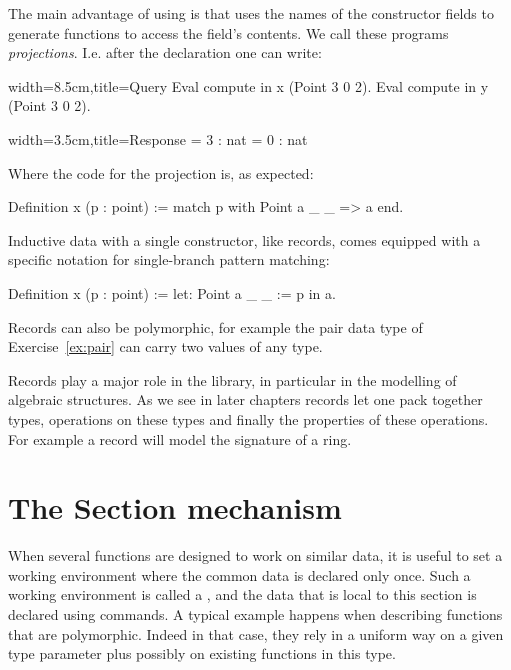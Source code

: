 The main advantage of using  is that \Coq{} uses the names of the
constructor fields to generate functions to access the field's contents.  We
call these programs \emph{projections}.  I.e. after the  declaration
one can write:

\begin{coq}{}{width=8.5cm,title=Query}
Eval compute in x (Point 3 0 2).
Eval compute in y (Point 3 0 2).
\end{coq}{}{}
\begin{coqout}{}{width=3.5cm,title=Response}
= 3 : nat
= 0 : nat
\end{coqout}{}{}
Where the code for the  projection is, as expected:

\begin{coq}{}{}
Definition x (p : point) := match p with Point a _ _ => a end.
\end{coq}
Inductive data with a single constructor, like records, comes
equipped with a specific notation for single-branch pattern
matching:

\begin{coq}{}{}
Definition x (p : point) := let: Point a _ _ := p in a.
\end{coq}

Records can also be polymorphic, for example the pair data type of
Exercise~\ref{ex:pair} can carry two values of any type.

Records play a major role in the \mcbMC{} library, in particular
in the modelling of algebraic structures.   As we see in later chapters
records let one pack together types, operations on these types and
finally the properties of these operations.  For example a record
will model the signature of a ring.


\section{The Section mechanism}\label{sec:section}
When several functions are designed to work on similar data, it is
useful to set a working environment where the common data is declared
only once.  Such a working environment is called a , and
the data that is local to this section is declared using 
commands.  A typical example happens when describing functions that
are polymorphic. Indeed in that case, they rely in a uniform way on a
given type parameter plus possibly on existing functions in this type.


